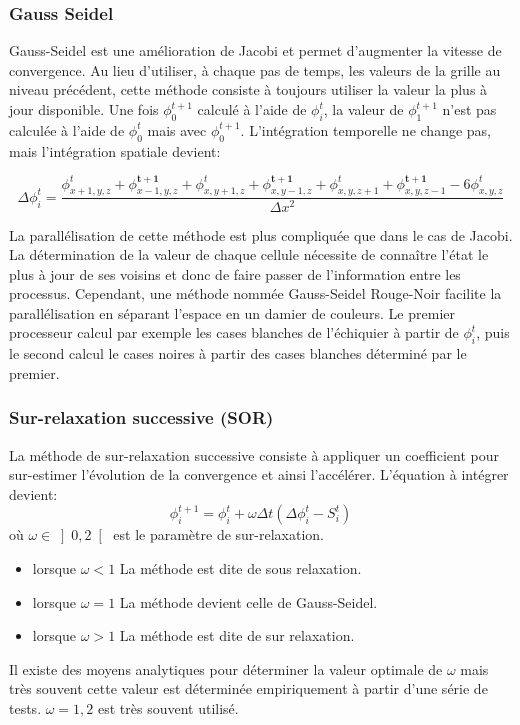 \subsubsection{Gauss Seidel}
Gauss-Seidel est une amélioration de Jacobi et permet d'augmenter la vitesse de convergence.%
Au lieu d'utiliser, à chaque pas de temps, les valeurs de la grille au niveau précédent, cette méthode consiste à toujours utiliser la valeur la plus à jour disponible. 
Une fois $\phi^{t+1}_0$ calculé à l'aide de $\phi^{t}_i$, la valeur de $\phi^{t+1}_1$ n'est pas calculée à l'aide de $\phi^{t}_0$ mais avec $\phi^{t+1}_0$. 
L'intégration temporelle ne change pas, mais l'intégration spatiale devient: 

\[ \Delta \phi_i^t = \dfrac{\phi_{x+1,y,z}^t  + \phi_{x-1,y,z}^\mathbf{t+1} + \phi_{x,y+1,z}^t  + \phi_{x,y-1,z}^\mathbf{t+1} + \phi_{x,y,z+1}^t + \phi_{x,y,z-1}^\mathbf{t+1}	- 6\phi_{x,y,z}^t}{\Delta x ^2} \]

La parallélisation de cette méthode est plus compliquée que dans le cas de Jacobi. 
La détermination de la valeur de chaque cellule nécessite de connaître l'état le plus à jour de ses voisins et donc de faire passer de l'information entre les processus.
Cependant, une méthode nommée Gauss-Seidel Rouge-Noir facilite la parallélisation en séparant l'espace en un damier de couleurs. 
Le premier processeur calcul par exemple les cases blanches de l'échiquier à partir de $\phi_i^t$, puis le second calcul le cases noires à partir des cases blanches déterminé par le premier.


\subsubsection{Sur-relaxation successive (SOR)}
La méthode de sur-relaxation successive consiste à appliquer un coefficient pour sur-estimer l'évolution de la convergence et ainsi l'accélérer. 
L'équation à intégrer devient:
\[ \phi^{t+1}_i = \phi^{t}_i + \omega  \Delta t \left (\Delta \phi_i^t -S^t_i \right )  \]
où $\omega \in \left] 0,2 \right [$ est le paramètre de sur-relaxation.
\begin{itemize}
\item lorsque $\omega <1$ La méthode est dite de sous relaxation.
\item lorsque $\omega =1$ La méthode devient celle de Gauss-Seidel.
\item lorsque $\omega >1$ La méthode est dite de sur relaxation.
\end{itemize}
Il existe des moyens analytiques pour déterminer la valeur optimale de $\omega$ mais très souvent cette valeur est déterminée empiriquement à partir d'une série de tests. 
$\omega = 1,2$ est très souvent utilisé.

